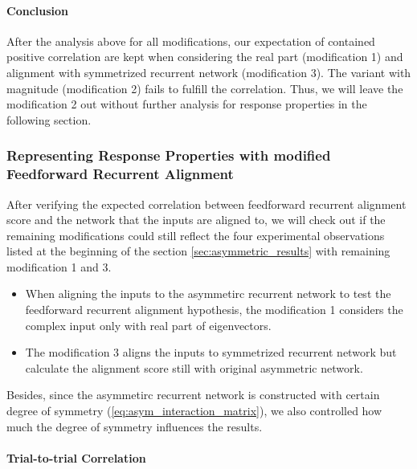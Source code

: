 \documentclass[11pt]{article}
\begin{document}
	\paragraph{Conclusion} After the analysis above for all modifications, our expectation of contained positive correlation are kept when considering the real part (modification 1) and alignment with symmetrized recurrent network (modification 3). The variant with magnitude (modification 2) fails to fulfill the correlation. Thus, we will leave the modification 2 out without further analysis for response properties in the following section. 
	
	\subsubsection{Representing Response Properties with modified Feedforward Recurrent Alignment} \label{sec:asym_ffrec_response}
	
	After verifying the expected correlation between feedforward recurrent alignment score and the network that the inputs are aligned to, we will check out if the remaining modifications could still reflect the four experimental observations listed at the beginning of the section \ref{sec:asymmetric_results} with remaining modification 1 and 3. 
	\begin{itemize}
		\item When aligning the inputs to the asymmetirc recurrent network to test the feedforward recurrent alignment hypothesis, the modification 1 considers the complex input only with real part of eigenvectors. 
		\item The modification 3 aligns the inputs to symmetrized recurrent network but calculate the alignment score still with original asymmetric network. 
	\end{itemize}
	
	Besides, since the asymmetirc recurrent network is constructed with certain degree of symmetry (\ref{eq:asym_interaction_matrix}), we also controlled how much the degree of symmetry influences the results. 
	
	\paragraph{Trial-to-trial Correlation}
	
\end{document}
